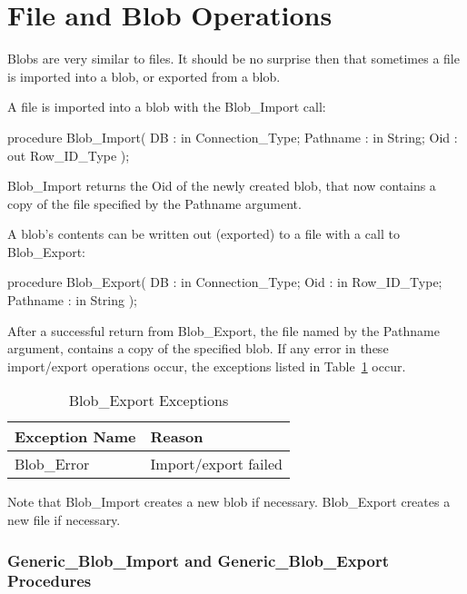\documentclass[english,letterpaper]{book}
\begin{document}
\section{File and Blob Operations}

Blobs are very similar to files. It should be no surprise
then that sometimes a file is imported into a blob,
or exported from a blob.

A file is imported into a blob with the Blob\_Import call:

\begin{Code}
procedure Blob_Import(
   DB :       in     Connection_Type;
   Pathname : in     String;
   Oid :         out Row_ID_Type
);
\end{Code}

Blob\_Import returns the Oid of the newly created blob, that now contains
a copy of the file specified by the Pathname argument.

A blob's contents can be written out (exported) to a file with a call
to Blob\_Export:

\begin{Code}
procedure Blob_Export(
   DB :       in Connection_Type;
   Oid :      in Row_ID_Type;
   Pathname : in String
);
\end{Code}

After a successful return from Blob\_Export, the file named by the
Pathname argument, contains a copy of the specified blob.
If any error in these import/export operations occur, the
exceptions listed in Table~\ref{t:blbxpx} occur.

\begin{table}
   \begin{center}
      \begin{tabular}{ll}
         Exception Name       &  Reason\\
         \hline 
         Blob\_Error          &  Import/export failed\\
      \end{tabular}
   \end{center}
   \caption{Blob\_Export Exceptions}\label{t:blbxpx}
\end{table}

Note that Blob\_Import creates a new blob if necessary. Blob\_Export
creates a new file if necessary.


\subsubsection{Generic\_Blob\_Import and Generic\_Blob\_Export Procedures}
\end{document}
